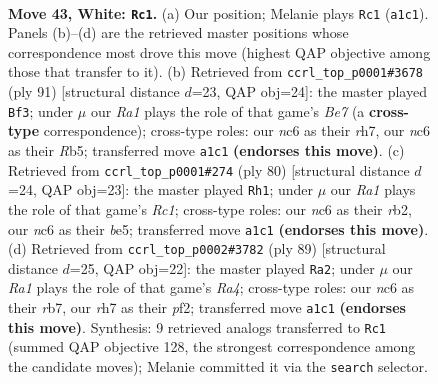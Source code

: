 \documentclass[11pt]{article}
\begin{document}
\clearpage

\begin{figure}[p]\centering
\begin{subfigure}{0.46\textwidth}\centering
\resizebox{\linewidth}{!}{%
\newchessgame
\chessboard[
  setfen={6k1/7r/p1n5/8/1P3P2/2B5/P3b1K1/R7 w - - 0 43},
  showmover=false,
  pgfstyle=straightmove, color=movearrow, markmove={a1-c1}
]}
\caption{}
\end{subfigure}\hfill
\begin{subfigure}{0.46\textwidth}\centering
\resizebox{\linewidth}{!}{%
\newchessgame
\chessboard[
  setfen={2k5/7R/p2K4/1r5p/8/2B3P1/1P2b3/8 b - - 7 46},
  showmover=false,
  pgfstyle=straightmove, color=movearrow, markmove={e2-f3}
]}
\caption{}
\end{subfigure}
\\[4pt]
\begin{subfigure}{0.46\textwidth}\centering
\resizebox{\linewidth}{!}{%
\newchessgame
\chessboard[
  setfen={8/8/8/1P2b1kp/2B5/5KP1/1r6/2R5 w - - 1 41},
  showmover=false,
  pgfstyle=straightmove, color=movearrow, markmove={c1-h1}
]}
\caption{}
\end{subfigure}\hfill
\begin{subfigure}{0.46\textwidth}\centering
\resizebox{\linewidth}{!}{%
\newchessgame
\chessboard[
  setfen={8/1R4pp/4N3/r3p3/6k1/8/3b1PKP/8 b - - 1 45},
  showmover=false,
  pgfstyle=straightmove, color=movearrow, markmove={a5-a2}
]}
\caption{}
\end{subfigure}
\caption{\textbf{Move 43, White: \texttt{Rc1}.} (a) Our position; Melanie plays \texttt{Rc1} (\texttt{a1c1}). Panels (b)--(d) are the retrieved master positions whose correspondence most drove this move (highest QAP objective among those that transfer to it). (b) Retrieved from \texttt{ccrl\_top\_p0001\#3678} (ply 91) [structural distance $d$=23, QAP obj=24]: the master played \texttt{Bf3}; under $\mu$ our \emph{Ra1} plays the role of that game's \emph{Be7} (a \textbf{cross-type} correspondence); cross-type roles: our \emph{n}c6 as their \emph{r}h7, our \emph{n}c6 as their \emph{R}b5; transferred move \texttt{a1c1} \textbf{(endorses this move)}. (c) Retrieved from \texttt{ccrl\_top\_p0001\#274} (ply 80) [structural distance $d$=24, QAP obj=23]: the master played \texttt{Rh1}; under $\mu$ our \emph{Ra1} plays the role of that game's \emph{Rc1}; cross-type roles: our \emph{n}c6 as their \emph{r}b2, our \emph{n}c6 as their \emph{b}e5; transferred move \texttt{a1c1} \textbf{(endorses this move)}. (d) Retrieved from \texttt{ccrl\_top\_p0002\#3782} (ply 89) [structural distance $d$=25, QAP obj=22]: the master played \texttt{Ra2}; under $\mu$ our \emph{Ra1} plays the role of that game's \emph{Ra4}; cross-type roles: our \emph{n}c6 as their \emph{r}b7, our \emph{r}h7 as their \emph{p}f2; transferred move \texttt{a1c1} \textbf{(endorses this move)}. Synthesis: 9 retrieved analogs transferred to \texttt{Rc1} (summed QAP objective 128, the strongest correspondence among the candidate moves); Melanie committed it via the \texttt{search} selector.}
\label{fig:thought-m84}
\end{figure}
\end{document}
